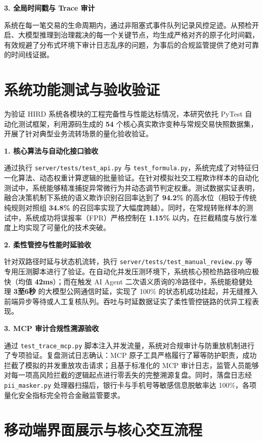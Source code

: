 \documentclass[twoside,openright]{xduugthesis}
\begin{document}
\textbf{3. 全局时间戳与 Trace 审计}

系统在每一笔交易的生命周期内，通过非阻塞式事件队列记录风控足迹。从预检开启、大模型推理到治理裁决的每一个关键节点，均生成严格对齐的原子化时间戳，有效规避了分布式环境下审计日志乱序的问题，为事后的合规监管提供了绝对可靠的时间线证据。

\section{系统功能测试与验收验证}

为验证 HIRD 系统各模块的工程完备性与性能达标情况，本研究依托 PyTest 自动化测试框架，利用源码生成的 \textbf{54} 个核心真实欺诈变种与常规交易快照数据集，开展了针对典型业务流转场景的量化验收验证。

\textbf{1. 核心算法与自动化接口验收}

通过执行 \texttt{server/tests/test\_api.py} 与 \texttt{test\_formula.py}，系统完成了对特征归一化算法、动态权重计算逻辑的批量验证。在针对模拟社交工程欺诈样本的自动化测试中，系统能够精准捕捉异常微行为并动态调节判定权重。测试数据实证表明，融合决策机制下系统的语义欺诈识别召回率达到了 \textbf{94.2\%} 的高水位（相较于传统纯规则对照组 \textbf{34.8\%} 的召回率实现了大幅度跨越）。同时，在常规转账样本的测试中，系统成功将误报率（FPR）严格控制在 \textbf{1.15\%} 以内，在拦截精度与放行准度上均实现了可量化的技术突破。

\textbf{2. 柔性管控与性能时延验收}

针对双路径时延与状态机流转，执行 \texttt{server/tests/test\_manual\_review.py} 等专用压测脚本进行了验证。在自动化并发压测环境下，系统核心预检热路径响应极快（均值 \textbf{42ms}）；而在触发 AI Agent 二次语义质询的冷路径中，系统能稳健处理 \textbf{3至6秒} 的大模型公网通信时延，实现了 100\% 的状态机成功挂起，并无缝推入前端异步等待或人工复核队列。吞吐与时延数据证实了柔性管控链路的优异工程表现。

\textbf{3. MCP 审计合规性溯源验收}

通过 \texttt{test\_trace\_mcp.py} 脚本注入并发流量，系统对合规审计与防重放机制进行了专项验证。复盘测试日志确认：MCP 原子工具严格履行了幂等防护职责，成功拦截了模拟的并发重放攻击请求；且基于标准化的 MCP 审计日志，监管人员能够对每一项高风险拦截的逻辑起点进行零丢失的完整溯源复盘。同时，落盘日志经 \texttt{pii\_masker.py} 处理器扫描后，银行卡与手机号等敏感信息脱敏率达 100\%，各项量化安全指标完全符合金融监管要求。

\section{移动端界面展示与核心交互流程}
\end{document}
